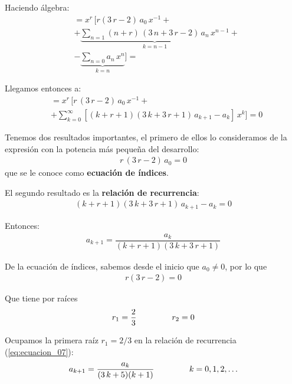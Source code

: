 Haciendo álgebra:
\begin{align*}
&= x^{r} \, \bigg[ r (3 \, r - 2) \, a_{0} \, x^{-1} +  \\[0.5em]
&+ \underbrace{\sum_{n=1} (n + r)\,(3 \, n + 3 \, r - 2) \, a_{n} \, x^{n-1}}_{k=n-1} + \\[0.5em]
&- \underbrace{\sum_{n=0} a_{n} \, x^{n}}_{k=n} \bigg] =
\end{align*}

Llegamos entonces a:
\begin{align*}
&= x^{r} \, \bigg[ r \, (3 \, r - 2) \, a_{0} \, x^{-1} + \\[0.5em]
&+ \sum_{k=0}^{\infty} \left[ (k + r + 1)(3 \, k + 3 \, r + 1) \, a_{k+1} - a_{k} \right] \, x^{k} \bigg] = 0
\end{align*}

Tenemos dos resultados importantes, el primero de ellos lo consideramos de la expresión con la potencia más pequeña del desarrollo:
\begin{align*}
r \, (3 \, r - 2) \, a_{0} = 0
\end{align*}
que se le conoce como \textbf{ecuación de índices}.

El segundo resultado es la \textbf{relación de recurrencia}:
\begin{align*}
(k + r + 1)(3 \, k + 3 \, r + 1) \, a_{k+1} - a_{k} = 0
\end{align*}

Entonces:
\begin{align}
a_{k+1} = \dfrac{a_{k}}{(k + r + 1)(3 \, k + 3 \, r + 1)}
\label{eq:ecuacion_07}
\end{align}

De la ecuación de índices, sabemos desde el inicio que $a_{0} \neq 0$, por lo que
\begin{align}
r (3 \, r - 2) = 0
\label{eq:ecuacion_06}
\end{align}

Que tiene por raíces
\begin{align*}
r_{1} = \dfrac{2}{3} \hspace{1.5cm} r_{2} = 0
\end{align*}

Ocupamos la primera raíz $r_{1} = 2/3$ en la relación de recurrencia (\ref{eq:ecuacion_07}):
\begin{align}
a_{k+1} = \dfrac{a_{k}}{(3 \, k + 5)(k + 1)} \hspace{1.5cm} k = 0, 1, 2, \ldots
\label{eq:ecuacion_08}    
\end{align}

